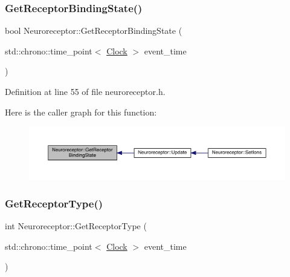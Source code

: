 \subsubsection{\texorpdfstring{Get\+Receptor\+Binding\+State()}{GetReceptorBindingState()}}
{\footnotesize\ttfamily bool Neuroreceptor\+::\+Get\+Receptor\+Binding\+State (\begin{DoxyParamCaption}\item[{std\+::chrono\+::time\+\_\+point$<$ \hyperlink{universe_8h_a0ef8d951d1ca5ab3cfaf7ab4c7a6fd80}{Clock} $>$}]{event\+\_\+time }\end{DoxyParamCaption})\hspace{0.3cm}{\ttfamily [inline]}}



Definition at line 55 of file neuroreceptor.\+h.

Here is the caller graph for this function\+:\nopagebreak
\begin{figure}[H]
\begin{center}
\leavevmode
\includegraphics[width=350pt]{class_neuroreceptor_afbcf31596170f09292e4d8057c0215e8_icgraph}
\end{center}
\end{figure}
\mbox{\label{class_neuroreceptor_a3ef0065a7670a2c156e34851140e0fa8}} 
\subsubsection{\texorpdfstring{Get\+Receptor\+Type()}{GetReceptorType()}}
{\footnotesize\ttfamily int Neuroreceptor\+::\+Get\+Receptor\+Type (\begin{DoxyParamCaption}\item[{std\+::chrono\+::time\+\_\+point$<$ \hyperlink{universe_8h_a0ef8d951d1ca5ab3cfaf7ab4c7a6fd80}{Clock} $>$}]{event\+\_\+time }\end{DoxyParamCaption})\hspace{0.3cm}{\ttfamily [inline]}}



